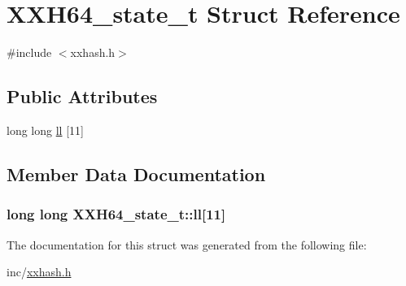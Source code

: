 \hypertarget{struct_x_x_h64__state__t}{}\section{X\+X\+H64\+\_\+state\+\_\+t Struct Reference}
\label{struct_x_x_h64__state__t}


{\ttfamily \#include $<$xxhash.\+h$>$}

\subsection*{Public Attributes}
\begin{DoxyCompactItemize}
\item 
long long \hyperlink{struct_x_x_h64__state__t_a9733d20d40ce914eabba76b954920ff9}{ll} \mbox{[}11\mbox{]}
\end{DoxyCompactItemize}


\subsection{Member Data Documentation}
\hypertarget{struct_x_x_h64__state__t_a9733d20d40ce914eabba76b954920ff9}{}
\subsubsection[{ll}]{\setlength{\rightskip}{0pt plus 5cm}long long X\+X\+H64\+\_\+state\+\_\+t\+::ll\mbox{[}11\mbox{]}}\label{struct_x_x_h64__state__t_a9733d20d40ce914eabba76b954920ff9}


The documentation for this struct was generated from the following file\+:\begin{DoxyCompactItemize}
\item 
inc/\hyperlink{xxhash_8h}{xxhash.\+h}\end{DoxyCompactItemize}
